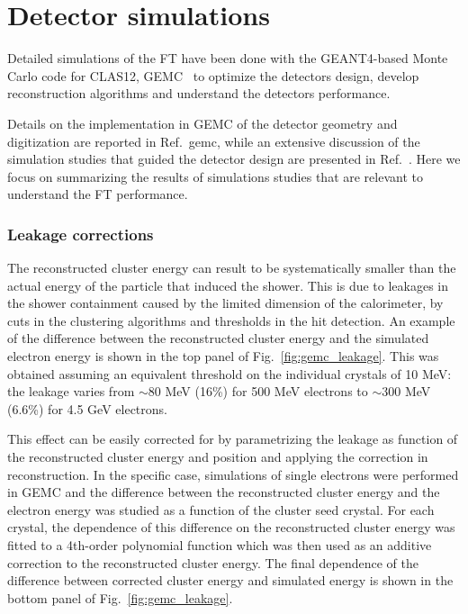 \section{Detector simulations}

Detailed simulations of the FT have been done with the
GEANT4-based Monte Carlo code for CLAS12, GEMC~\cite{gemc} 
to optimize the detectors design, develop reconstruction algorithms and understand the detectors performance.

Details on the implementation in GEMC of the detector geometry and digitization are reported in Ref.~{gemc}, while an extensive discussion of the simulation studies that guided the detector design are presented in Ref.~\cite{ft-tdr}. Here we focus on summarizing the results of simulations studies that are relevant to understand the FT performance.

\subsubsection{Leakage corrections}
The reconstructed cluster energy can result to be systematically
smaller than the actual energy of the particle that induced the shower. This is due to leakages in the shower containment caused by the limited dimension of the calorimeter, by cuts in the clustering algorithms and thresholds in the hit detection. An example of the difference between the reconstructed cluster energy and the simulated electron energy is shown in the top panel of Fig.~\ref{fig:gemc_leakage}. This was obtained assuming an equivalent threshold on  the individual crystals of 10 MeV:
the leakage varies from $\sim 80$ MeV (16\%) for 500 MeV electrons to $\sim 300$ MeV (6.6\%) for 4.5 GeV electrons.

This effect can be easily corrected for by
parametrizing the leakage as function of the reconstructed cluster energy and position and applying the
correction in reconstruction. In the specific case, simulations of single electrons were performed in GEMC and the difference between the reconstructed cluster energy and the electron energy was studied as a function of the cluster seed crystal. For each crystal, the dependence of this difference on the reconstructed cluster energy was fitted to a 4th-order polynomial function which was then used as an additive correction to the reconstructed cluster energy. The final dependence
of the difference between corrected cluster energy and simulated
energy is shown in the bottom panel of Fig.~\ref{fig:gemc_leakage}.

